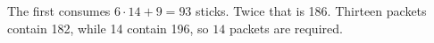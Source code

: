 The first consumes $6\cdot14+9=93$ sticks. Twice that is 186. Thirteen packets contain 182, while 14 contain 196, so $\boxed{14}$ packets are required.
